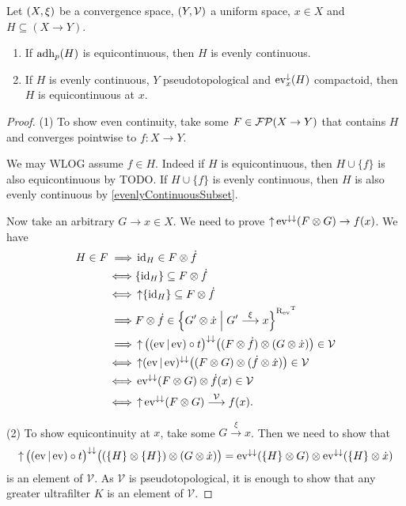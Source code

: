 \begin{proposition}
Let $\left( X,\xi \right)$ be a convergence space, $\left( Y, \mathcal{V} \right)$ a uniform space, $x\in X$ and $H \subseteq (X\to Y)$.
\begin{enumerate}
\item If $\operatorname{adh}_p(H)$ is equicontinuous, then $H$ is evenly continuous.
\item If $H$ is evenly continuous, $Y$ pseudotopological and $\operatorname{ev}_x^\downarrow(H)$ compactoid, then $H$ is equicontinuous at $x$.
\end{enumerate}
\end{proposition}
\begin{proof}
(1) To show even continuity, take some $F\in \operatorname{\mathcal{FP}}(X\to Y)$ that contains $H$ and converges pointwise to $f: X\to Y$. 

We may WLOG assume $f\in H$. Indeed if $H$ is equicontinuous, then $H\cup\{f\}$ is also equicontinuous by TODO. If $H\cup\{f\}$ is evenly continuous, then $H$ is also evenly continuous by \ref{evenlyContinuousSubset}.

Now take an arbitrary $G\to x\in X$. We need to prove $\operatorname{\uparrow}\operatorname{ev}^{\downarrow\downarrow}(F\otimes G)\to f(x)$. We have
\begin{align*}
H\in F \implies& \operatorname{id}_H \in F\otimes \dot{f} \\
\iff& \{\operatorname{id}_H\} \subseteq F\otimes \dot{f} \\
\iff& \operatorname{\uparrow}\{\operatorname{id}_H\} \subseteq F\otimes \dot{f} \\
\implies& F\otimes \dot{f} \in \left\{ G'\otimes \dot{x} \;\middle|\; G'\overset{\xi}{\longrightarrow}x \right\}^{\mathrel{\mathrm{R}_{\operatorname{ev}}}^{\mathrm{T}}} \\
\implies& \operatorname{\uparrow} \big((\operatorname{ev}|\operatorname{ev})\circ t\big)^{\downarrow\downarrow}\big((F\otimes \dot{f})\otimes (G\otimes \dot{x})\big) \in \mathcal{V} \\
\iff& \operatorname{\uparrow} (\operatorname{ev}|\operatorname{ev})^{\downarrow\downarrow}\big((F\otimes G)\otimes (\dot{f}\otimes \dot{x})\big) \in \mathcal{V} \\
\iff& \operatorname{ev}^{\downarrow\downarrow}(F\otimes G)\otimes \dot{f}(x) \in \mathcal{V} \\
\iff& \operatorname{\uparrow}\operatorname{ev}^{\downarrow\downarrow}(F\otimes G) \overset{\mathcal{V}}{\longrightarrow} f(x).
\end{align*}

(2) To show equicontinuity at $x$, take some $G\overset{\xi}{\longrightarrow} x$. Then we need to show that
\[ \operatorname{\uparrow} \big((\operatorname{ev}|\operatorname{ev})\circ t\big)^{\downarrow\downarrow}\big((\{H\}\otimes\{H\})\otimes (G\otimes \dot{x})\big) = \operatorname{ev}^{\downarrow\downarrow}(\{H\}\otimes G)\otimes \operatorname{ev}^{\downarrow\downarrow}(\{H\}\otimes \dot{x}) \]
is an element of $\mathcal{V}$. As $\mathcal{V}$ is pseudotopological, it is enough to show that any greater ultrafilter $K$ is an element of $\mathcal{V}$.
\end{proof}



